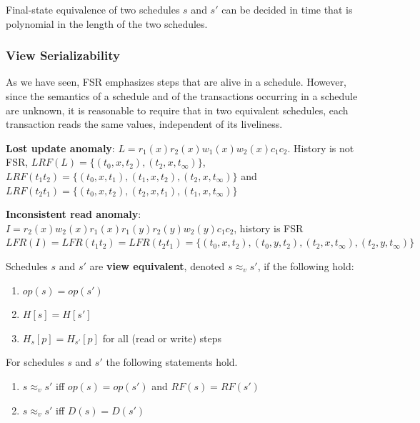 \documentclass[11pt]{article}
\begin{document}
\begin{corollary}[]
Final-state equivalence of two schedules \(s\) and \(s'\) can be decided in time that is
polynomial in the length of the two schedules.
\end{corollary}
\subsubsection{View Serializability}
\label{sec:orga7e1851}
As we have seen, FSR emphasizes steps that are alive in a schedule. However, since the semantics
of a schedule and of the transactions occurring in a schedule are unknown, it is reasonable to
require that in two equivalent schedules, each transaction reads the same values, independent of
its liveliness.

\textbf{Lost update anomaly}: \(L=r_1(x)r_2(x)w_1(x)w_2(x)c_1c_2\). History is not
FSR,
 \(LRF(L)=\{(t_0,x,t_2),(t_2,x,t_\infty)\}\),
 \(LRF(t_1t_2)=\{(t_0,x,t_1),(t_1,x,t_2),(t_2,x,t_\infty)\}\) and
 \(LRF(t_2t_1)=\{(t_0,x,t_2),(t_2,x,t_1),(t_1,x,t_\infty)\}\)


\textbf{Inconsistent read anomaly}: \(I=r_2(x)w_2(x)r_1(x)r_1(y)r_2(y)w_2(y)c_1c_2\), history is FSR
\(LFR(I)=LFR(t_1t_2)=LFR(t_2t_1)=\{(t_0,x,t_2),(t_0,y,t_2),(t_2,x,t_\infty),(t_2,y,t_\infty)\}\)


\begin{definition}
Schedules \(s\) and \(s'\) are \textbf{view equivalent}, denoted \(s\approx_vs'\), if the following
hold:
\begin{enumerate}
\item \(op(s)=op(s')\)
\item \(H[s]=H[s']\)
\item \(H_s[p]=H_{s'}[p]\) for all (read or write) steps
\end{enumerate}
\end{definition}

\begin{theorem}[]
For schedules \(s\) and \(s'\) the following statements hold.
\begin{enumerate}
\item \(s\approx_v s'\) iff \(op(s)=op(s')\) and \(RF(s)=RF(s')\)
\item \(s\approx_vs'\) iff \(D(s)=D(s')\)
\end{enumerate}
\end{theorem}
\end{document}
